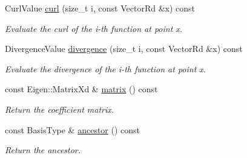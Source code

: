 \begin{DoxyCompactItemize}
Curl\+Value \hyperlink{classHArDCore3D_1_1Family_af5aac63dc865a440eb25c6b41b8d66d1}{curl} (size\+\_\+t i, const Vector\+Rd \&x) const
\begin{DoxyCompactList}\small\item\em Evaluate the curl of the i-\/th function at point x. \end{DoxyCompactList}\item 
\mbox{\label{classHArDCore3D_1_1Family_a87cbacf4f0cf12e0c9cfe9afa2e40c29}} 
Divergence\+Value \hyperlink{classHArDCore3D_1_1Family_a87cbacf4f0cf12e0c9cfe9afa2e40c29}{divergence} (size\+\_\+t i, const Vector\+Rd \&x) const
\begin{DoxyCompactList}\small\item\em Evaluate the divergence of the i-\/th function at point x. \end{DoxyCompactList}\item 
\mbox{\label{classHArDCore3D_1_1Family_af056ff8a6cbf5c566c243290e72af217}} 
const Eigen\+::\+Matrix\+Xd \& \hyperlink{classHArDCore3D_1_1Family_af056ff8a6cbf5c566c243290e72af217}{matrix} () const
\begin{DoxyCompactList}\small\item\em Return the coefficient matrix. \end{DoxyCompactList}\item 
\mbox{\label{classHArDCore3D_1_1Family_a7afd19f4c3c17b7ac8ed16115b0ffe1c}} 
const Basis\+Type \& \hyperlink{classHArDCore3D_1_1Family_a7afd19f4c3c17b7ac8ed16115b0ffe1c}{ancestor} () const
\begin{DoxyCompactList}\small\item\em Return the ancestor. \end{DoxyCompactList}\end{DoxyCompactItemize}
